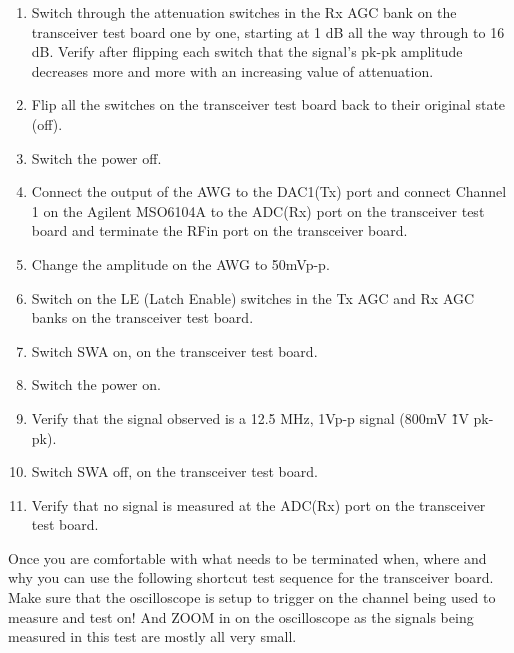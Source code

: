 \begin{enumerate}
	\item Switch through the attenuation switches in the Rx AGC bank on the transceiver test board one by one, starting at 1 dB all the way through to 16 dB. Verify after flipping each switch that the signal’s pk-pk amplitude decreases more and more with an increasing value of attenuation.
	\item Flip all the switches on the transceiver test board back to their original state (off).
	\item Switch the power off.
	\item Connect the output of the AWG to the DAC1(Tx) port and connect Channel 1 on the Agilent MSO6104A to the ADC(Rx) port on the transceiver test board and terminate the RFin port on the transceiver board.
	\item Change the amplitude on the AWG to 50mVp-p.
	\item Switch on the LE (Latch Enable) switches in the Tx AGC and Rx AGC banks on the transceiver test board.
	\item Switch SWA on, on the transceiver test board.
	\item Switch the power on.
	\item Verify that the signal observed is a 12.5 MHz, 1Vp-p signal (800mV \~ 1V pk-pk).
	\item Switch SWA off, on the transceiver test board.
	\item Verify that no signal is measured at the ADC(Rx) port on the transceiver test board.
\end{enumerate}

Once you are comfortable with what needs to be terminated when, where and why you can use the following shortcut test sequence for the transceiver board. Make sure that the oscilloscope is setup to trigger on the channel being used to measure and test on! And ZOOM in on the oscilloscope as the signals being measured in this test are mostly all very small.

